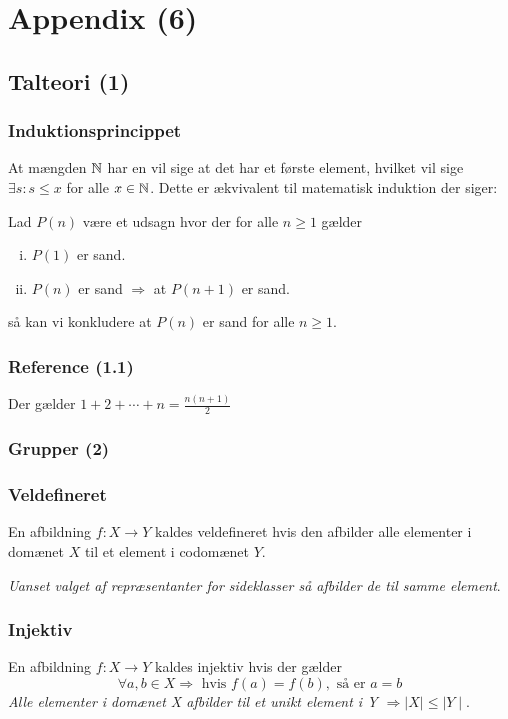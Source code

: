 \section{Appendix (6)}
\label{Appendix (6)}
\subsection{Talteori (1)}
\subsubsection{Induktionsprincippet}
At mængden $\mathbb{N}$ har en  vil sige at det har et første
element, hvilket vil sige $\exists s : s \leq x$ for alle $x \in \mathbb{N}$. Dette er
ækvivalent til matematisk induktion der siger:

Lad $P(n)$ være et udsagn hvor der for alle $n \geq 1$ gælder
\begin{enumerate}[(i)]
  \item $P(1)$ er sand.
  \item $P(n)$ er sand $\Rightarrow$ at $P(n + 1)$ er sand.
\end{enumerate}
så kan vi konkludere at $P(n)$ er sand for alle $n \geq 1$.

\subsubsection{Reference (1.1)}
Der gælder $1 + 2 + \cdots + n = \frac{n(n+1)}{2}$

\subsubsection{Grupper (2)}
\label{Grupper (2)}
\subsubsection{Veldefineret}
\label{Veldefineret}
En afbildning $f: X \to Y$ kaldes veldefineret hvis den afbilder alle elementer
i domænet $X$ til et element i codomænet $Y$.

\textit{Uanset valget af repræsentanter for sideklasser så afbilder de til
samme element}.

\subsubsection{Injektiv}
\label{Injektiv}
En afbildning $f: X \to Y$ kaldes injektiv hvis der gælder
\begin{equation*}
  \forall a, b \in X \Rightarrow \text{ hvis } f(a) = f(b), \text{ så er } a
  = b
\end{equation*}
\textit{Alle elementer i domænet X afbilder til et unikt element i Y
$\Rightarrow \mid X\mid \leq \mid Y\mid$}.


